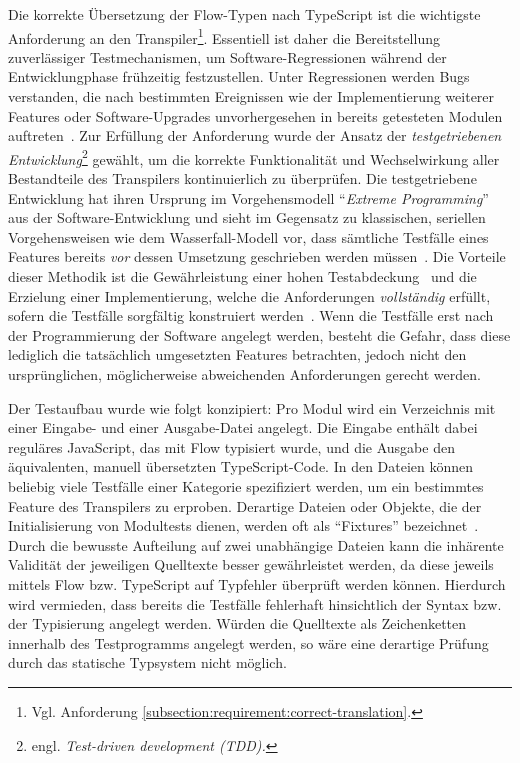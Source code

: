 Die korrekte Übersetzung der Flow-Typen nach TypeScript ist die wichtigste Anforderung an den Transpiler\footnote{Vgl. Anforderung \ref{subsection:requirement:correct-translation}.}. Essentiell ist daher die Bereitstellung zuverlässiger Testmechanismen, um Software-Regressionen während der Entwicklungphase frühzeitig festzustellen. Unter Regressionen werden Bugs verstanden, die nach bestimmten Ereignissen wie der Implementierung weiterer Features oder Software-Upgrades unvorhergesehen in bereits getesteten Modulen auftreten~\autocite[218]{DOR:SOFTWARE_TEST}. Zur Erfüllung der Anforderung wurde der Ansatz der \emph{testgetriebenen Entwicklung}\footnote{engl. \textit{Test-driven development (TDD).}} gewählt, um die korrekte Funktionalität und Wechselwirkung aller Bestandteile des Transpilers kontinuierlich zu überprüfen. Die testgetriebene Entwicklung hat ihren Ursprung im Vorgehensmodell \enquote{\textit{Extreme Programming}}~\autocite{JEFFRIES:EXTREME_PROGRAMMING} aus der Software-Entwicklung und sieht im Gegensatz zu klassischen, seriellen Vorgehensweisen wie dem Wasserfall-Modell vor, dass sämtliche Testfälle eines Features bereits \emph{vor} dessen Umsetzung geschrieben werden müssen~\autocite{BECK:EXTREME_PROGRAMMING}. Die Vorteile dieser Methodik ist die Gewährleistung einer hohen Testabdeckung~\autocite[90]{BECK:TDD} und die Erzielung einer Implementierung, welche die Anforderungen \emph{vollständig} erfüllt, sofern die Testfälle sorgfältig konstruiert werden~\autocite[214]{BECK:TDD}. Wenn die Testfälle erst nach der Programmierung der Software angelegt werden, besteht die Gefahr, dass diese lediglich die tatsächlich umgesetzten Features betrachten, jedoch nicht den ursprünglichen, möglicherweise abweichenden Anforderungen gerecht werden.

Der Testaufbau wurde wie folgt konzipiert: Pro Modul wird ein Verzeichnis mit einer Ein\-gabe- und einer Ausgabe-Datei angelegt. Die Eingabe enthält dabei reguläres JavaScript, das mit Flow typisiert wurde, und die Ausgabe den äquivalenten, manuell übersetzten TypeScript-Code. In den Dateien können beliebig viele Testfälle einer Kategorie spezifiziert werden, um ein bestimmtes Feature des Transpilers zu erproben. Derartige Dateien oder Objekte, die der Initialisierung von Modultests dienen, werden oft als \enquote{Fixtures} bezeichnet~\autocite{OLAN:2003}. Durch die bewusste Aufteilung auf zwei unabhängige Dateien kann die inhärente Validität der jeweiligen Quelltexte besser gewährleistet werden, da diese jeweils mittels Flow bzw. TypeScript auf Typfehler überprüft werden können. Hierdurch wird vermieden, dass bereits die Testfälle fehlerhaft hinsichtlich der Syntax bzw. der Typisierung angelegt werden. Würden die Quelltexte als Zeichenketten innerhalb des Testprogramms angelegt werden, so wäre eine derartige Prüfung durch das statische Typsystem nicht möglich.

